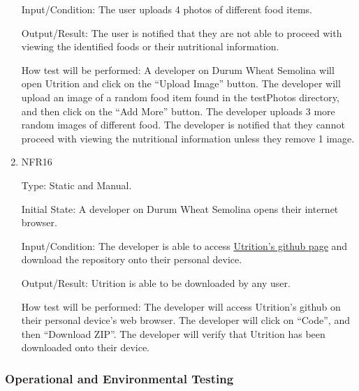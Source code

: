 \documentclass[12pt, titlepage]{article}
\begin{document}
\begin{enumerate}
Input/Condition: The user uploads 4 photos of different food items.

Output/Result: The user is notified that they are not able to proceed with viewing the identified foods or their nutritional information.

How test will be performed: A developer on Durum Wheat Semolina will open Utrition and click on the “Upload Image” button. The developer will upload an image of a random food item found in the testPhotos directory, and then click on the “Add More” button. The developer uploads 3 more random images of different food. The developer is notified that they cannot proceed with viewing the nutritional information unless they remove 1 image.

\item{NFR16\\} 

Type: Static and Manual.

Initial State: A developer on Durum Wheat Semolina opens their internet browser.

Input/Condition: The developer is able to access \href{https://github.com/jeff-rey-wang/utrition}{Utrition’s github page} and download the repository onto their personal device.

Output/Result: Utrition is able to be downloaded by any user.

How test will be performed: The developer will access Utrition’s github on their personal device’s web browser. The developer will click on “Code”, and then “Download ZIP”. The developer will verify that Utrition has been downloaded onto their device.
\end{enumerate}

\subsubsection{Operational and Environmental Testing}

\end{document}
